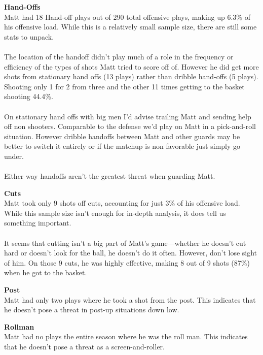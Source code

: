\documentclass[a4paper,12pt]{article}
\begin{document}
\begin{multicols}{2}
    {\large \noindent \textbf{Hand-Offs}} \\ 
    Matt had 18 Hand-off plays out of 290 total offensive plays, making up 6.3\% of his offensive load. While this is a relatively small sample size, there are still some stats to unpack. \\ \\
    The location of the handoff didn’t play much of a role in the frequency or efficiency of the types of shots Matt tried to score off of. However he did get more shots from stationary hand offs (13 plays) rather than dribble hand-offs (5 plays). Shooting only 1 for 2 from three and the other 11 times getting to the basket shooting 44.4\%.  \\ \\
    On stationary hand offs with big men I’d advise trailing Matt and sending help off non shooters. Comparable to the defense we’d play on Matt in a pick-and-roll situation. However dribble handoffs between Matt and other guards may be better to switch it entirely or if the matchup is non favorable just simply go under. \\ \\
    Either way handoffs aren’t the greatest threat when guarding Matt. \vspace{1em}
    
    {\large \noindent \textbf{Cuts}} \\
    Matt took only 9 shots off cuts, accounting for just 3\% of his offensive load. While this sample size isn't enough for in-depth analysis, it does tell us something important. \\ \\
    It seems that cutting isn't a big part of Matt's game—whether he doesn't cut hard or doesn't look for the ball, he doesn't do it often. However, don't lose sight of him. On those 9 cuts, he was highly effective, making 8 out of 9 shots (87\%) when he got to the basket. \vspace{1em}
    
    {\large \noindent \textbf{Post}} \\
    Matt had only two plays where he took a shot from the post. This indicates that he doesn't pose a threat in post-up situations down low.

    {\large \noindent \textbf{Rollman}} \\
    Matt had no plays the entire season where he was the roll man. This indicates that he doesn't pose a threat as a screen-and-roller.


\end{multicols}
\end{document}
